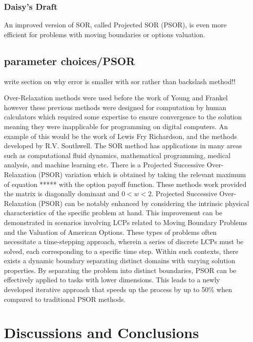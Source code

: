 \documentclass[11pt]{article}
\begin{document}
\newpage

\subsubsection{Daisy's Draft}

An improved version of SOR, called Projected SOR (PSOR), is even more efficient for problems with moving boundaries or options valuation. 

\subsection{parameter choices/PSOR}
 write section on why error is smaller with sor rather than backslash method!!
 
Over-Relaxation methods were used before the work of Young and Frankel however these previous methods were designed for computation by human calculators which required some expertise to ensure convergence to the solution meaning they were inapplicable for programming on digital computers. An example of this would be the work of Lewis Fry Richardson, and the methods developed by R.V. Southwell. The SOR method has applications in many areas such as computational fluid dynamics, mathematical programming, medical analysis, and machine learning etc.
There is a Projected  Successive Over-Relaxation (PSOR) variation which is obtained by taking the relevant maximum of equation ***** with the option payoff function. These methods work provided the matrix is diagonally dominant and $0 < w < 2$.  Projected Successive Over-Relaxation (PSOR) can be notably enhanced by considering the intrinsic physical characteristics of the specific problem at hand. This improvement can be demonstrated in scenarios involving LCPs related to Moving Boundary Problems and the Valuation of American Options. These types of problems often necessitate a time-stepping approach, wherein a series of discrete LCPs must be solved, each corresponding to a specific time step. Within such contexts, there exists a dynamic boundary separating distinct domains with varying solution properties. By separating the problem into distinct boundaries, PSOR can be effectively applied to tasks with lower dimensions. This leads to a newly developed iterative approach that speeds up the process by up to 50\% when compared to traditional PSOR methods.

\section{Discussions and  Conclusions} %
\end{document}
